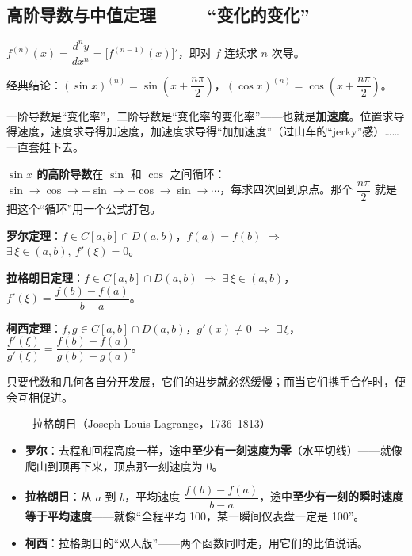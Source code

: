 \documentclass[11pt,a4paper]{article}
\newcommand{\qattr}[1]{{\normalfont\upshape\small\par\raggedleft—— #1\par}}
\newcommand{\keyw}[1]{\colorbox{cYellowL}{\textbf{\color{cOrange}#1}}}
\begin{document}
\newpage
\subsection{高阶导数与中值定理 —— “变化的变化”}

\begin{defbox}[高阶导数]
$f^{(n)}(x)=\dfrac{d^n y}{dx^n}=\big[f^{(n-1)}(x)\big]'$，即对 $f$ 连续求 $n$ 次导。

经典结论：$(\sin x)^{(n)}=\sin\!\left(x+\dfrac{n\pi}{2}\right)$，$(\cos x)^{(n)}=\cos\!\left(x+\dfrac{n\pi}{2}\right)$。
\end{defbox}

\begin{plainbox}[白话解读：高阶导数 = “套娃”]
一阶导数是“变化率”，二阶导数是“变化率的变化率”——也就是\textbf{加速度}。位置求导得速度，速度求导得加速度，加速度求导得“加加速度”（过山车的“jerky”感）……一直套娃下去。

\keyw{$\sin x$ 的高阶导数}在 $\sin$ 和 $\cos$ 之间循环：$\sin\to\cos\to-\sin\to-\cos\to\sin\to\cdots$，每求四次回到原点。那个 $\dfrac{n\pi}{2}$ 就是把这个“循环”用一个公式打包。
\end{plainbox}

\begin{thmbox}
\begin{cndot}
  \item \textbf{罗尔定理}：$f\in C[a,b]\cap D(a,b)$，$f(a)=f(b)$ $\Rightarrow$ $\exists\,\xi\in(a,b),\ f'(\xi)=0$。
  \item \textbf{拉格朗日定理}：$f\in C[a,b]\cap D(a,b)$ $\Rightarrow$ $\exists\,\xi\in(a,b)$，$f'(\xi)=\dfrac{f(b)-f(a)}{b-a}$。
  \item \textbf{柯西定理}：$f,g\in C[a,b]\cap D(a,b)$，$g'(x)\ne 0$ $\Rightarrow$ $\exists\,\xi$，$\dfrac{f'(\xi)}{g'(\xi)}=\dfrac{f(b)-f(a)}{g(b)-g(a)}$。
\end{cndot}
\end{thmbox}

\begin{quotebox}
只要代数和几何各自分开发展，它们的进步就必然缓慢；而当它们携手合作时，便会互相促进。
\qattr{拉格朗日（Joseph-Louis Lagrange，1736--1813）}
\end{quotebox}

\begin{plainbox}
\begin{itemize}[leftmargin=1.4em,itemsep=3pt]
  \item \textbf{罗尔}：去程和回程高度一样，途中\textbf{至少有一刻速度为零}（水平切线）——就像爬山到顶再下来，顶点那一刻速度为 0。
  \item \textbf{拉格朗日}：从 $a$ 到 $b$，平均速度 $\dfrac{f(b)-f(a)}{b-a}$，途中\textbf{至少有一刻的瞬时速度等于平均速度}——就像“全程平均 100，某一瞬间仪表盘一定是 100”。
  \item \textbf{柯西}：拉格朗日的“双人版”——两个函数同时走，用它们的比值说话。
\end{itemize}
\end{plainbox}
\end{document}
